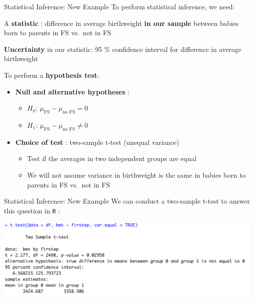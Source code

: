 \documentclass[
  ignorenonframetext,
]{beamer}
\providecommand{\tightlist}{%
  \setlength{\itemsep}{0pt}\setlength{\parskip}{0pt}}
\begin{document}
\begin{frame}{Statistical Inference: New Example}
\protect\hypertarget{statistical-inference-new-example-6}{}
To perform statistical inference, we need:

A \textbf{statistic} : difference in average birthweight \textbf{in our
sample} between babies born to parents in FS vs.~not in FS

\textbf{Uncertainty} in our statistic: 95 \% confidence interval for
difference in average birthweight

To perform a \textbf{hypothesis test}:

\begin{itemize}
\item
  \textbf{Null and alternative hypotheses} :

  \begin{itemize}
  \tightlist
  \item
    \(H_0\): \(\mu_{\text{FS}} - \mu_{\text{no FS}} = 0\)
  \item
    \(H_1\): \(\mu_{\text{FS}} - \mu_{\text{no FS}} \neq 0\)
  \end{itemize}
\item
  \textbf{Choice of test} : two-sample t-test (unequal variance)

  \begin{itemize}
  \tightlist
  \item
    Test if the averages in two independent groups are equal
  \item
    We will not assume variance in birthweight is the same in babies
    born to parents in FS vs.~not in FS
  \end{itemize}
\end{itemize}
\end{frame}

\begin{frame}{Statistical Inference: New Example}
\protect\hypertarget{statistical-inference-new-example-7}{}
We can conduct a two-sample t-test to answer this question in \texttt{R}
:

\includegraphics{ttest1.png}
\end{frame}
\end{document}
